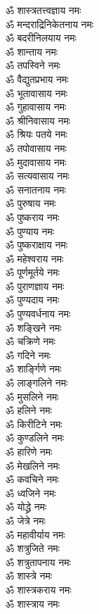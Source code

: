 \begin{multicols}{2}
\begin{flushleft}
ॐ शास्त्रतत्त्वज्ञाय नमः\\
ॐ मन्दराद्रिनिकेतनाय नमः\\
ॐ बदरीनिलयाय नमः\\
ॐ शान्ताय नमः\\
ॐ तपस्विने नमः\\
ॐ वैद्युतप्रभाय नमः\\
ॐ भूतावासाय नमः\\
ॐ गुहावासाय नमः\\
ॐ श्रीनिवासाय नमः\\
ॐ श्रियः पतये नमः\hfill{}\\
ॐ तपोवासाय नमः\\
ॐ मुदावासाय नमः\\
ॐ सत्यवासाय नमः\\
ॐ सनातनाय नमः\\
ॐ पुरुषाय नमः\\
ॐ पुष्कराय नमः\\
ॐ पुण्याय नमः\\
ॐ पुष्कराक्षाय नमः\\
ॐ महेश्वराय नमः\\
ॐ पूर्णमूर्तये नमः\hfill{}\\
ॐ पुराणज्ञाय नमः\\
ॐ पुण्यदाय नमः\\
ॐ पुण्यवर्धनाय नमः\\
ॐ शङ्खिने नमः\\
ॐ चक्रिणे नमः\\
ॐ गदिने नमः\\
ॐ शार्ङ्गिणे नमः\\
ॐ लाङ्गलिने नमः\\
ॐ मुसलिने नमः\\
ॐ हलिने नमः\hfill{}\\
ॐ किरीटिने नमः\\
ॐ कुण्डलिने नमः\\
ॐ हारिणे नमः\\
ॐ मेखलिने नमः\\
ॐ कवचिने नमः\\
ॐ ध्वजिने नमः\\
ॐ योद्ध्रे नमः\\
ॐ जेत्रे नमः\\
ॐ महावीर्याय नमः\\
ॐ शत्रुजिते नमः\hfill{}\\
ॐ शत्रुतापनाय नमः\\
ॐ शास्त्रे नमः\\
ॐ शास्त्रकराय नमः\\
ॐ शास्त्राय नमः\\

\end{flushleft}
\end{multicols}
